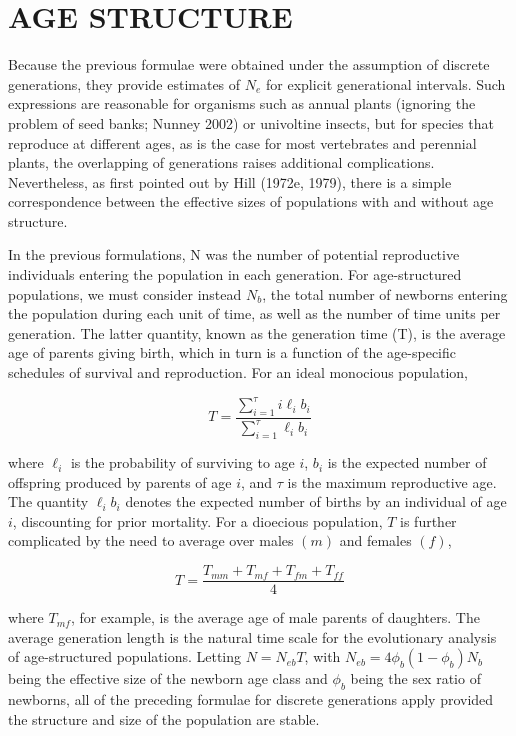 \documentclass{article}
\begin{document}
\section{AGE STRUCTURE}
Because the previous formulae were obtained under the assumption of discrete generations, they provide estimates of  $ N_{e} $ for explicit generational intervals. Such expressions are reasonable for organisms such as annual plants (ignoring the problem of seed banks; Nunney 2002) or univoltine insects, but for species that reproduce at different ages, as is the case for most vertebrates and perennial plants, the overlapping of generations raises additional complications. Nevertheless, as first pointed out by Hill (1972e, 1979), there is a simple correspondence between the effective sizes of populations with and without age structure.

In the previous formulations, N was the number of potential reproductive individuals entering the population in each generation. For age-structured populations, we must consider instead  $ N_{b} $, the total number of newborns entering the population during each unit of time, as well as the number of time units per generation. The latter quantity, known as the generation time (T), is the average age of parents giving birth, which in turn is a function of the age-specific schedules of survival and reproduction. For an ideal monocious population,

\begin{equation}
T=\frac{\sum\limits_{i=1}^{\tau}i\ell_{i}b_{i}}{\sum\limits_{i=1}^{\tau}\ell_{i}b_{i}}
\tag{3.13}
\label{eq:3_13}
\end{equation}

where  $ \ell_i $ is the probability of surviving to age  $ i $,  $ b_i $ is the expected number of offspring produced by parents of age  $ i $, and  $ \tau $ is the maximum reproductive age. The quantity  $ \ell_i b_i $ denotes the expected number of births by an individual of age  $ i $, discounting for prior mortality. For a dioecious population,  $ T $ is further complicated by the need to average over males  $ (m) $ and females  $ (f) $,

\begin{equation}
T=\frac{T_{mm}+T_{mf}+T_{fm}+T_{ff}}{4}
\tag{3.14}
\label{eq:3_14}
\end{equation}

where  $ T_{mf} $, for example, is the average age of male parents of daughters. The average generation length is the natural time scale for the evolutionary analysis of age-structured populations. Letting  $ N = N_{eb}T $, with  $ N_{eb} = 4\phi_b(1 - \phi_b)N_b $ being the effective size of the newborn age class and  $ \phi_b $ being the sex ratio of newborns, all of the preceding formulae for discrete generations apply provided the structure and size of the population are stable.
\end{document}
